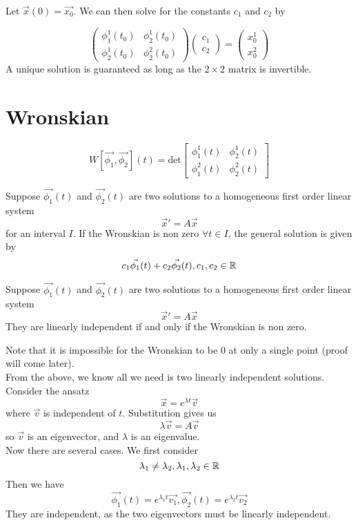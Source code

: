 \documentclass[12pt]{article}
\begin{document}
Let $\vec{x}(0) = \vec{x_0}$. We can then solve for the constants $c_1$ and $c_2$ by

$$\begin{pmatrix} \phi_1^1(t_0) & \phi_2^1(t_0) \\ \phi_2^1(t_0) & \phi_2^2(t_0)\end{pmatrix} \begin{pmatrix} c_1 \\ c_2 \end{pmatrix} = \begin{pmatrix} x_0^1 \\ x_0^2 \end{pmatrix}$$
A unique solution is guaranteed as long as the $2\times2$ matrix is invertible.

\section{Wronskian}

\begin{defn}
	$$W[\vec{\phi_1}, \vec{\phi_2}](t) = \text{det}\begin{bmatrix} \phi_1^1(t) & \phi_2^1(t) \\ \phi_1^2(t) & \phi_2^2(t) \end{bmatrix}$$
\end{defn}

\begin{thm}
	Suppose $\vec{\phi_1}(t)$ and $\vec{\phi_2}(t)$ are two solutions to a homogeneous first order linear system
	$$\vec{x}' = A\vec{x}$$
	for an interval $I$. If the Wronskian is non zero $\forall t \in I$, the general solution is given by
	$$c_1\vec{\phi_1}(t) + c_2\vec{\phi_2}(t), c_1,c_2 \in \mathbb{R}$$
\end{thm}

\begin{thm}
	Suppose $\vec{\phi_1}(t)$ and $\vec{\phi_2}(t)$ are two solutions to a homogeneous first order linear system
	$$\vec{x}' = A\vec{x}$$
	They are linearly independent if and only if the Wronskian is non zero.
\end{thm}

Note that it is impossible for the Wronskian to be 0 at only a single point (proof will come later). \\
From the above, we know all we need is two linearly independent solutions. Consider the ansatz
$$\vec{x} = e^{\lambda t}\vec{v}$$
where $\vec{v}$ is independent of $t$. Substitution gives us
$$\lambda \vec{v} = A\vec{v}$$
so $\vec{v}$ is an eigenvector, and $\lambda$ is an eigenvalue. \\
Now there are several cases. We first consider
$$\lambda_1 \neq \lambda_2, \lambda_1, \lambda_2 \in \mathbb{R}$$
Then we have $$\vec{\phi_1}(t) = e^{\lambda_1t}\vec{v_1}, \vec{\phi_2}(t) = e^{\lambda_2t}\vec{v_2}$$
They are independent, as the two eigenvectors must be linearly independent. \\
\end{document}
